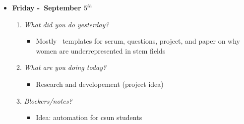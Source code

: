 \begin{itemize}
  \item[] \textbf{\large Friday -\ September \(5^{th}\)}
  \begin{enumerate}
    \item \textsl{What did you do yesterday?}
    \begin{itemize}
      \item Mostly \TEX\ templates for scrum, questions, project, and paper on why women are underrepresented in stem fields
    \end{itemize}
    \item \textsl{What are you doing today?}
    \begin{itemize}
      \item Research and developement (project idea)
    \end{itemize}
    \item \textsl{Blockers/notes?}
    \begin{itemize}
      \item Idea: automation for csun students
    \end{itemize}
  \end{enumerate}
\end{itemize}